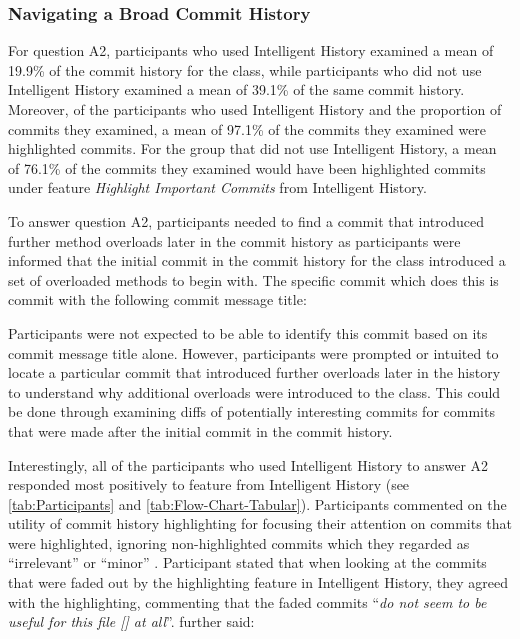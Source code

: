 \subsubsection{Navigating a Broad Commit History}

For question A2, participants who used Intelligent History examined a mean of 19.9\% of the commit history for the  class,
while participants who did not use Intelligent History examined a mean of 39.1\% of the same commit history. 
Moreover, of the participants who used Intelligent History and the proportion of commits they examined,
a mean of 97.1\% of the commits they examined were highlighted commits.
For the group that did not use Intelligent History, a mean of 76.1\% of the commits they examined would have been highlighted commits under feature  \textit{Highlight Important Commits} from Intelligent History.

To answer question A2, participants needed to find a commit that introduced further \newline 
{} method overloads later in the commit history as participants were informed that the initial commit in the commit history for the  class introduced a set of overloaded  methods to begin with.
The specific commit which does this is commit  with the following commit message title:

\begin{center}
\end{center}

Participants were not expected to be able to identify this commit based on its commit message title alone.
However, participants were prompted or intuited to locate a particular commit that introduced further overloads later in the history to understand why additional overloads were introduced to the  class.
This could be done through examining diffs of potentially interesting commits for commits that were made after the initial commit in the  commit history.

Interestingly, all of the participants who used Intelligent History to answer A2 responded most positively to feature  from Intelligent History  (see \autoref{tab:Participants} and \autoref{tab:Flow-Chart-Tabular}).
Participants commented on the utility of commit history highlighting for focusing their attention on commits that were highlighted, ignoring non-highlighted commits which they regarded as ``irrelevant'' or ``minor'' .
Participant  stated that when looking at the commits that were faded out by the highlighting feature in Intelligent History,
they agreed with the highlighting, commenting that the faded commits ``\textit{do not seem to be useful for this file [] at all}''.
 further said:

